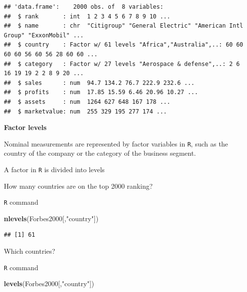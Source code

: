 \documentclass[]{book}
\newenvironment{Shaded}{\begin{snugshade}}{\end{snugshade}}
\newcommand{\KeywordTok}[1]{\textcolor[rgb]{0.13,0.29,0.53}{\textbf{#1}}}
\newcommand{\StringTok}[1]{\textcolor[rgb]{0.31,0.60,0.02}{#1}}
\newcommand{\NormalTok}[1]{#1}
\begin{document}
\begin{verbatim}
## 'data.frame':    2000 obs. of  8 variables:
##  $ rank       : int  1 2 3 4 5 6 7 8 9 10 ...
##  $ name       : chr  "Citigroup" "General Electric" "American Intl Group" "ExxonMobil" ...
##  $ country    : Factor w/ 61 levels "Africa","Australia",..: 60 60 60 60 56 60 56 28 60 60 ...
##  $ category   : Factor w/ 27 levels "Aerospace & defense",..: 2 6 16 19 19 2 2 8 9 20 ...
##  $ sales      : num  94.7 134.2 76.7 222.9 232.6 ...
##  $ profits    : num  17.85 15.59 6.46 20.96 10.27 ...
##  $ assets     : num  1264 627 648 167 178 ...
##  $ marketvalue: num  255 329 195 277 174 ...
\end{verbatim}

\textbf{Factor levels}

Nominal measurements are represented by factor variables in \texttt{R},
such as the country of the company or the category of the business
segment.

A factor in \texttt{R} is divided into levels

How many countries are on the top 2000 ranking?

\texttt{R} command

\begin{Shaded}
\begin{Highlighting}[]
\KeywordTok{nlevels}\NormalTok{(Forbes2000[,}\StringTok{"country"}\NormalTok{])}
\end{Highlighting}
\end{Shaded}

\begin{verbatim}
## [1] 61
\end{verbatim}

Which countries?

\texttt{R} command

\begin{Shaded}
\begin{Highlighting}[]
\KeywordTok{levels}\NormalTok{(Forbes2000[,}\StringTok{"country"}\NormalTok{])}
\end{Highlighting}
\end{Shaded}
\end{document}
